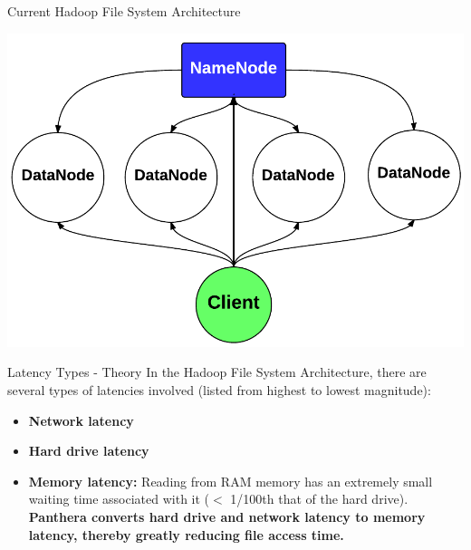 \documentclass[final]{beamer} %
\begin{document}
\begin{frame}
\begin{columns}[t]
\begin{column}{0.32\textwidth}
		\begin{block}{Current Hadoop File System Architecture}
			\centerline{\includegraphics[scale=1.4]{assets/v2/vanilla_hadoop_arch.pdf}}
		\end{block}
	
		\begin{block}{Latency Types - Theory}
		In the Hadoop File System Architecture, there are several types of latencies involved (listed from highest to lowest magnitude):
		\begin{itemize}
		\item \textbf{Network latency}
		\item \textbf{Hard drive latency}
		\item \textbf{Memory latency: } Reading from RAM memory has an extremely small
		waiting time associated with it ($<$ 1/100th that of the hard drive). \textbf{Panthera converts hard drive and network latency to memory latency, thereby greatly reducing file access time.}
		\end{itemize}
	  	\end{block}
	  

     \end{column}


\end{columns}
\end{frame}
\end{document}
